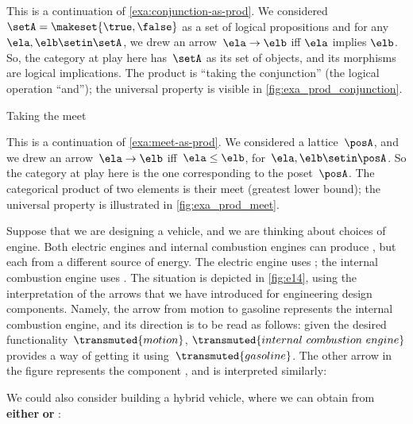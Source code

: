 \begin{example}
    \label{exa:conjunction-as-prod-cont}
    This is a continuation of \cref{exa:conjunction-as-prod}.
    We considered~$\setA = \makeset{ \true, \false }$ as a set of logical propositions and for any~$\ela, \elb  \setin \setA$, we drew an arrow~$\ela \to \elb$ iff $\ela$ implies $\elb$.
    So, the category at play here has~$\setA$ as its set of objects, and its morphisms are logical implications.
    The product is ``taking the conjunction'' (the logical operation ``and''); the universal property is visible in \cref{fig:exa_prod_conjunction}.

\end{example}

\begin{marginfigure}
    \centering
    \caption{Taking the meet}
    \label{fig:exa_prod_meet_cont}
\end{marginfigure}

\begin{example}
    \label{exa:meet-as-prod-cont}
    This is a continuation of \cref{exa:meet-as-prod}.
    We considered a lattice~$\posA$, and we drew an arrow~$\ela \to \elb$ iff~$\ela \leq \elb$, for~$\ela,\elb\setin \posA$.
    So the category at play here is the one corresponding to the poset~$\posA$.
    The categorical product of two elements is their meet (greatest lower bound); the universal property is illustrated in \cref{fig:exa_prod_meet}.
\end{example}

\begin{example}
    Suppose that we are designing a vehicle, and we are thinking about choices of engine.
    Both electric engines and internal combustion engines can produce , but each from a different source of energy.
    The electric engine uses ; the internal combustion engine uses .
    The situation is depicted in \cref{fig:e14}, using the interpretation of the arrows that we have introduced for engineering design components.
    Namely, the arrow from motion to gasoline represents the internal combustion engine, and its direction is to be read as follows: given the desired functionality~$\transmuted{motion}$, $\transmuted{internal \ combustion \ engine}$ provides a way of getting it using~$\transmuted{gasoline}$.
    The other arrow in the figure represents the component , and is interpreted similarly:


    We could also consider building a hybrid vehicle, where we can obtain  from \textbf{either}  \textbf{or} :

\end{example}

